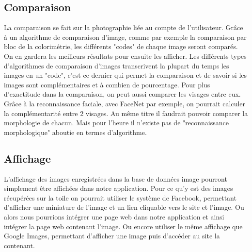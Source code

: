 \documentclass[a4paper,12pt]{article}
\begin{document}
 \subsection{Comparaison}
 La comparaison se fait sur la photographie liée au compte de l'utilisateur. Grâce à un algorithme de comparaison d'image, comme par exemple la comparaison par bloc de la colorimétrie, les différents "codes" de chaque image seront comparés. On en gardera les meilleurs résultats pour ensuite les afficher. Les différents types d'algorithmes de comparaison d'images transcrivent la plupart du temps les images en un "code", c'est ce dernier qui permet la comparaison et de savoir si les images sont complémentaires et à combien de pourcentage. Pour plus d'exactitude dans la comparaison, on peut aussi comparer les visages entre eux. Grâce à la reconnaissance faciale, avec FaceNet par exemple, on pourrait calculer la complémentarité entre 2 visages. Au même titre il faudrait pouvoir comparer la morphologie de chacun. Mais pour l'heure il n'existe pas de "reconnaissance morphologique" aboutie en termes d'algorithme. 

\subsection{Affichage}
L'affichage des images enregistrées dans la base de données image pourront simplement être affichées dans notre application. Pour ce qu'y est des images récupérées sur la toile on pourrait utiliser le système de Facebook, permettant d'afficher une miniature de l'image et un lien cliquable vers le site et l'image. Ou alors nous pourrions intégrer une page web dans notre application et ainsi intégrer la page web contenant l'image. Ou encore utiliser le même affichage que Google Images, permettant d'afficher une image puis d'accéder au site la contenant. 
\end{document}
